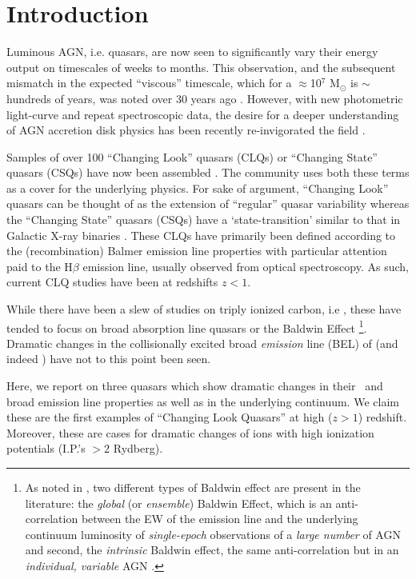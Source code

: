 \documentclass[a4paper,fleqn,usenatbib]{mnras}
\begin{document}
\section{Introduction}
Luminous AGN, i.e. quasars, are now seen to significantly vary their
energy output on timescales of weeks to months.  This observation, and
the subsequent mismatch in the expected ``viscous'' timescale, which
for a $\approx$10$^{7}$ M$_{\odot}$ is $\sim$hundreds of years, was
noted over 30 years ago \citep[e.g.][]{Alloin1985}. However, with new
photometric light-curve and repeat spectroscopic data, the desire for
a deeper understanding of AGN accretion disk physics has been recently
re-invigorated the field \citep[e.g.][]{Lawrence2018, Antonucci2018}.

Samples of over 100 ``Changing Look'' quasars (CLQs) or ``Changing State'' quasars (CSQs) have now been 
assembled \citep[e.g.][]{MacLeod2019, Graham2019}. The community uses both these
terms as a cover for the underlying physics. For sake of argument, ``Changing Look'' quasars can be 
thought of as the extension of ``regular'' quasar variability \citep[e.g.][]{MacLeod2012} whereas 
the ``Changing State'' quasars (CSQs) have a `state-transition' similar to that in Galactic X-ray binaries
\citep[e.g][]{NodaDone2018, Ruan2019}. 
%
These CLQs have primarily been defined according to the (recombination) Balmer emission line properties with 
particular attention paid to the H$\beta$ emission line, usually observed from optical spectroscopy. 
As such, current CLQ studies have been at redshifts $z<1$. 

While there have been a slew of studies on triply ionized carbon, i.e
\civ, these have tended to focus on broad absorption line quasars
\citep[BAL QSOs; see e.g. Table 1][]{Hemler2019} or the Baldwin Effect
\citep[BEff; e.g. ][]{Baldwin1977, Bian2012, Jensen2016,
Hamann2017}\footnote{As noted in \citet{Rakic2017}, two different
types of Baldwin effect are present in the literature: the {\it
global} (or {\it ensemble}) Baldwin Effect, which is an anti-correlation
between the EW of the emission line and the underlying continuum
luminosity of {\it single-epoch} observations of a {\it large number}
of AGN and second, the {\it intrinsic} Baldwin effect, the same anti-correlation
but in an {\it individual, variable} AGN \citep{PoggePeterson1992}.}.
Dramatic changes in the collisionally excited  broad {\it emission} line (BEL) 
of \civ (and indeed \ciii) have not to this point been seen. 

Here, we report on three quasars  
which show dramatic changes in their \civ\ and \ciii broad emission line
properties as well as in the underlying continuum. We claim these are
the first examples of ``Changing Look Quasars'' at high ($z>1$)
redshift. Moreover, these are cases for dramatic changes of 
ions with high ionization potentials (I.P.'s $>$2 Rydberg).
\end{document}
